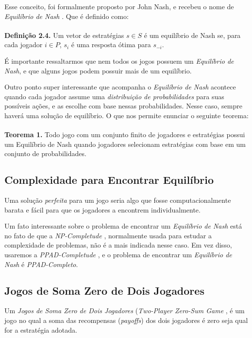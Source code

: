 \documentclass[twoside,conference,a4paper]{IEEEtran}
\begin{document}
            Esse conceito, foi formalmente proposto por John Nash, e recebeu o nome de \emph{Equilíbrio de Nash} \cite{algorithmic-game-theory-book}. Que é definido como: \\ \\
            \textbf{Definição 2.4.} Um vetor de estratégias $s \in S$ é um equilíbrio de Nash se, para cada jogador $i \in P$, $s_i$ é uma resposta ótima para $s_{−i}$.
            
            É importante ressaltarmos que nem todos os jogos possuem um \emph{Equilíbrio de Nash}, e que alguns jogos podem possuir mais de um equilíbrio.
            
            Outro ponto super interessante que acompanha o \emph{Equilíbrio de Nash} acontece quando cada jogador assume uma \emph{distribuição de probabilidades} para suas possíveis ações, e as escolhe com base nessas probabilidades. Nesse caso, sempre haverá uma solução de equilíbrio. O que nos permite enunciar o seguinte teorema: \\ \\
            \textbf{Teorema 1.} Todo jogo com um conjunto finito de jogadores e estratégias possui um Equilíbrio de Nash quando jogadores selecionam estratégias com base em um conjunto de probabilidades.
        
        \subsection{Complexidade para Encontrar Equilíbrio}
            Uma solução \emph{perfeita} para um jogo seria algo que fosse computacionalmente barata e fácil para que os jogadores a encontrem individualmente.
            
            Um fato interessante sobre o problema de encontrar um \emph{Equilíbrio de Nash} está no fato de que a \emph{NP-Completude} \cite{}, normalmente usada para estudar a complexidade de problemas, não é a mais indicada nesse caso. Em vez disso, usaremos a \emph{PPAD-Completude} \cite{}, e o problema de encontrar um \emph{Equilíbrio de Nash} é \emph{PPAD-Completo}.
            
        \subsection{Jogos de Soma Zero de Dois Jogadores}
            Um \emph{Jogos de Soma Zero de Dois Jogadores} (\emph{Two-Player Zero-Sum Game} \cite{chen2006settling}, é um jogo no qual a soma das recompensas (\emph{payoffs}) dos dois jogadores é zero seja qual for a estratégia adotada. 
            
\end{document}
